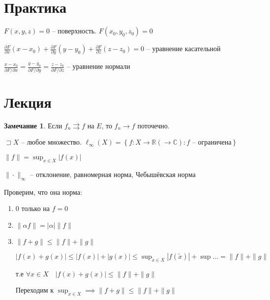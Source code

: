 \documentclass{book}
\newcommand\R{\ensuremath{\mathbb{R}}}
\renewcommand\C{\ensuremath{\mathbb{C}}}
\newcommand{\tl}[1]{\widetilde{#1}}
\theoremstyle{definition}
\newtheorem*{note}{Замечание}
\begin{document}
    \section{Практика}

    $F(x,y,z) = 0$ -- поверхность.  $F\left( x_0, y_0, z_0 \right) = 0$

    $\frac{\partial F}{\partial x}\left( x-x_0 \right)  + \frac{\partial F}{\partial y}\left( y-y_0 \right)  + \frac{\partial F}{\partial z}\left( z-z_0 \right) =0$ -- уравнение касательной

    $\frac{x-x_0}{\partial F / \partial x}= \frac{y-y_0}{\partial F / \partial y} = \frac{z-z_0}{\partial F / \partial z}$ -- уравнение нормали

    \section{Лекция}
        
    \begin{note}
        Если $f_n\rightrightarrows f$ на  $E$, то  $f_n\to f$ поточечно.

        $\sqsupset X$ -- любое множество. $\ell _{\infty }(X) = \left\{ f: X\to \R(\to \C): f \text{ -- ограничена} \right\} $ 

         \begin{definition}
             $\|f\|=\sup_{x\in X}\left| f(x) \right| $ 

             $\|\cdot\|_{\infty }$ -- отклонение, равномерная норма, Чебышёвская норма
        \end{definition}

        Проверим, что она норма:
        \begin{enumerate}
            \item 0 только на $f = 0$  
            \item $\|\alpha f\| = |\alpha| \|f\|$ 
            \item $\|f + g\|\leqslant \|f \| + \|g\|$

                $|f(x) + g(x)|\leqslant |f(x)| + |g(x)| \leqslant \sup_{\tl x\in X}|f(\tl x)| + \sup \ldots = \|f\| + \|g\|$ 

                т.е $\forall x\in X\quad |f(x) + g(x)|\leqslant \|f\| + \|g\|$

                Переходим к $\sup_{x\in X}\implies \|f + g\| \leqslant \|f\| + \|g\|$ 
        \end{enumerate}
    \end{note}
\end{document}

